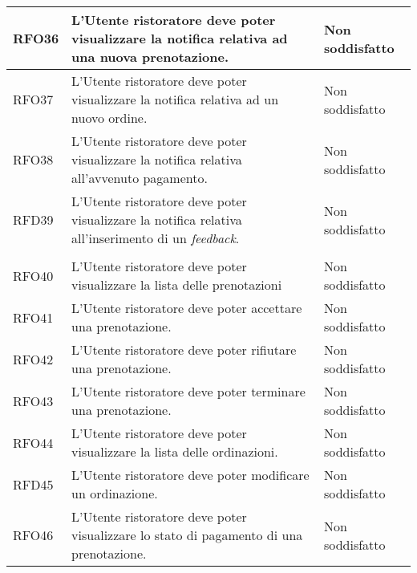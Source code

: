 \begin{longtable}{|l|p{}|p{3cm}|}
	\hline
	RFO36       & L'Utente ristoratore deve poter visualizzare la notifica relativa ad una nuova prenotazione.                         & Non soddisfatto                                 \\
	\hline
	RFO37       & L'Utente ristoratore deve poter visualizzare la notifica relativa ad un nuovo ordine.                                & Non soddisfatto                                       \\
	\hline
	RFO38       & L'Utente ristoratore deve poter visualizzare la notifica relativa all'avvenuto pagamento.                            & Non soddisfatto                              \\
	\hline
	RFD39       & L'Utente ristoratore deve poter visualizzare la notifica relativa all'inserimento di un \textit{feedback}.           & Non soddisfatto                            \\                                                                                                                                                      \\
	\hline
	RFO40       & L'Utente ristoratore deve poter visualizzare la lista delle prenotazioni											   & Non soddisfatto                 \\
	\hline		
	RFO41       & L'Utente ristoratore deve poter accettare una prenotazione.                                                           & Non soddisfatto                               \\
	\hline
	RFO42       & L'Utente ristoratore deve poter rifiutare una prenotazione.                                                           & Non soddisfatto                               \\
	\hline
	RFO43       & L'Utente ristoratore deve poter terminare una prenotazione.                                                           & Non soddisfatto                               \\
	\hline
	RFO44       & L'Utente ristoratore deve poter visualizzare la lista delle ordinazioni.                                              & Non soddisfatto                  \\
	\hline
	RFD45       & L'Utente ristoratore deve poter modificare un ordinazione.                                                            & Non soddisfatto                               \\
	\hline
	RFO46       & L'Utente ristoratore deve poter visualizzare lo stato di pagamento di una prenotazione.                               & Non soddisfatto                 \\

\end{longtable}
